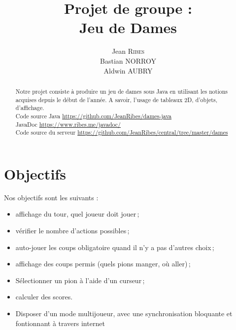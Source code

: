 \documentclass{article}
\title{Projet de groupe :\\ Jeu de Dames} %
\author{Jean \textsc{Ribes}\\Bastian \textsc{NORROY}\\Aldwin \textsc{AUBRY}} %
\date{} %
\begin{document}
\maketitle %
\vfill

\begin{abstract}
Notre projet consiste à produire un jeu de dames sous Java en utilisant les notions acquises depuis le début de l'année. A savoir, l'usage de tableaux 2D, d'objets, d'affichage.
\\
Code source Java \url{https://github.com/JeanRibes/dames-java}
\\JavaDoc \url{https://www.ribes.me/javadoc/}
\\Code source du serveur \url{https://github.com/JeanRibes/central/tree/master/dames}
\end{abstract}
\vfill
\section{Objectifs}

Nos objectifs sont les suivants :
\begin{itemize}
\item affichage du tour, quel joueur doit jouer\,;
\item vérifier le nombre d'actions possibles\,;
\item auto-jouer les coups obligatoire quand il n'y a pas d'autres choix\,;
\item affichage des coups permis (quels pions manger, où aller)\,;
\item Sélectionner un pion à l'aide d'un curseur\,;
\item calculer des scores.
\item Disposer d'un mode multijoueur, avec une synchronisation bloquante et fontionnant à travers internet
\end{itemize}
\end{document}
